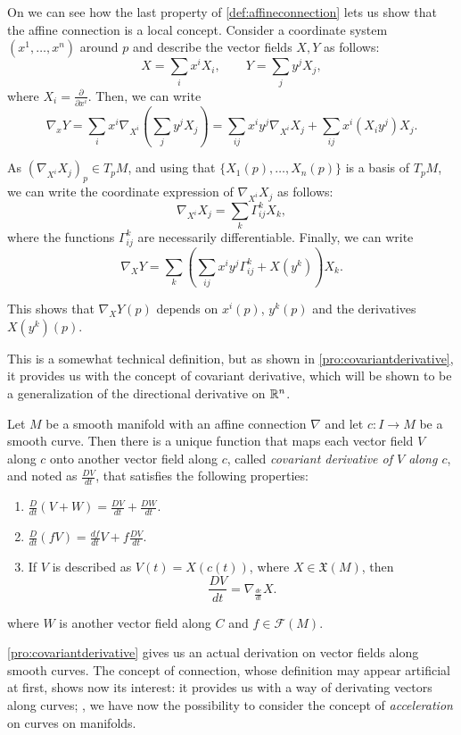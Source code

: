 On \cite[Chapter 2, Remark 2.3]{docarmo79} we can see how the last property of \autoref{def:affineconnection} lets us show that the affine connection is a local concept. Consider a coordinate system $(x^1, \dots, x^n)$ around $p$ and describe the vector fields $X, Y$ as follows:
\[
X = \sum_i x^i X_i, \qquad Y = \sum_j y^j X_j,
\]
where $X_i = \frac{\partial}{\partial x^i}$. Then, we can write
\[
\nabla_x Y = \sum_i x^i \nabla_{X^i}\left(\sum_j y^j X_j \right) = \sum_{ij} x^i y^j \nabla_{X^i} X_j + \sum_{ij} x^i (X_i y^j) X_j.
\]

As $(\nabla_{X^i} X_j)_p \in T_p M$, and using that $\{X_1(p), \dots, X_n(p)\}$ is a basis of $T_p M$, we can write the coordinate expression of $\nabla_{X^i} X_j$ as follows:
\[
\nabla_{X^i} X_j = \sum_k \Gamma^k_{ij} X_k,
\]
where the functions $\Gamma^k_{ij}$ are necessarily differentiable. Finally, we can write
\[
\nabla_X Y = \sum_k \left( \sum_{ij} x^i y^j \Gamma^k_{ij} + X(y^k) \right) X_k.
\]

This shows that $\nabla_X Y(p)$ depends on $x^i(p)$, $y^k(p)$ and the derivatives $X(y^k)(p)$.

This is a somewhat technical definition, but as shown in \autoref{pro:covariantderivative}, it provides us with the concept of covariant derivative, which will be shown to be a generalization of the directional derivative on $\mathbb{R}^n$.

\begin{proposition}
	\label{pro:covariantderivative}
	Let $M$ be a smooth manifold with an affine connection $\nabla$ and let $c \colon I \to M$ be a smooth curve. Then there is a unique function that maps each vector field $V$ along $c$ onto another vector field along $c$, called \emph{covariant derivative of $V$ along $c$}, and noted as $\frac{DV}{dt}$, that satisfies the following properties:
	\begin{enumerate}
		\item $\frac{D}{dt}(V+W) = \frac{DV}{dt} + \frac{DW}{dt}$.
		\item $\frac{D}{dt}(fV) = \frac{df}{dt}V + f\frac{DV}{dt}$.
		\item If $V$ is described as $V(t) = X(c(t))$, where $X \in \mathfrak{X}(M)$, then \[\frac{DV}{dt} = \nabla_{\frac{dc}{dt}} X.\]
	\end{enumerate}
	where $W$ is another vector field along $C$ and $f \in \mathcal{F}(M)$.
\end{proposition}

\autoref{pro:covariantderivative} gives us an actual derivation on vector fields along smooth curves. The concept of connection, whose definition may appear artificial at first, shows now its interest: it provides us with a way of derivating vectors along curves; \ie, we have now the possibility to consider the concept of \emph{acceleration} on curves on manifolds.


